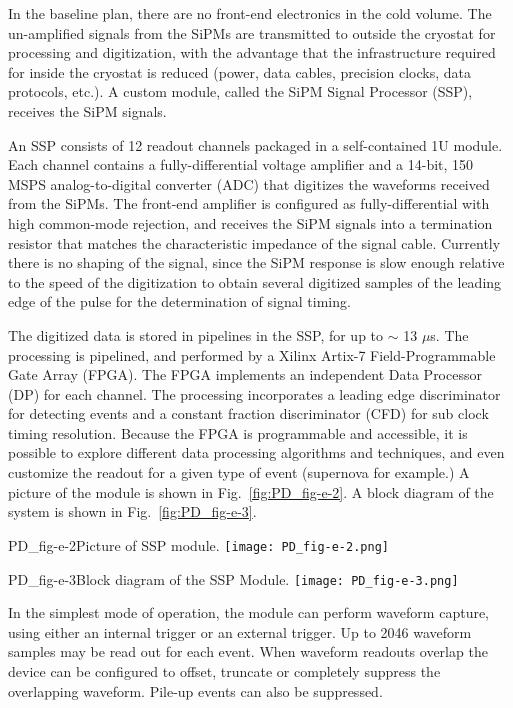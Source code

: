 In the baseline plan, there are no front-end electronics in the cold volume.  
The un-amplified signals from the SiPMs 
are transmitted to outside the cryostat %
for processing and digitization, with
the advantage that the infrastructure required for inside the cryostat is 
reduced (power, data cables, precision clocks, data protocols, etc.).  
%
A custom module, called the SiPM Signal Processor (SSP), receives the SiPM signals. %

An SSP consists of 12 readout channels packaged in a self-contained 
1U module.  
Each channel contains a fully-differential voltage amplifier and a 
14-bit, 150 MSPS analog-to-digital converter (ADC) that 
digitizes the waveforms received from the SiPMs.  
The front-end amplifier is configured as fully-differential with high common-mode 
rejection, and receives the SiPM signals into a termination resistor that 
matches the characteristic impedance of the signal cable. 
Currently there is no shaping of the signal, since the SiPM response 
is slow enough relative to the speed of the digitization to obtain 
several digitized samples of the leading edge of the pulse for the determination of signal timing.  

The digitized data is stored in pipelines in the SSP, for up to $\sim$ 13 $\mu$s.  
The processing is pipelined, and performed by a Xilinx Artix-7 
Field-Programmable Gate Array (FPGA).  
The FPGA implements an independent Data Processor (DP) for each channel.  
The processing incorporates a leading edge discriminator for detecting events
and a constant fraction discriminator (CFD) for sub 
clock timing resolution.  
Because the FPGA is programmable and accessible, it is possible to explore 
different data processing algorithms and techniques, and even customize the 
readout for a given type of event (supernova for example.)  
A picture of the module is shown in Fig.~\ref{fig:PD_fig-e-2}.  
A block diagram of the system is shown in Fig.~\ref{fig:PD_fig-e-3}.
%
\begin{cdrfigure}{PD_fig-e-2}{Picture of SSP module.}
  \texttt{[image: PD\_fig-e-2.png]}
\end{cdrfigure}

\begin{cdrfigure}{PD_fig-e-3}{Block diagram of the SSP Module.}
  \texttt{[image: PD\_fig-e-3.png]}
\end{cdrfigure}
%
In the simplest mode of operation, the module can perform waveform capture, 
using either an internal trigger or an external trigger.  
Up to 2046 waveform samples may be read out for each event.  When waveform 
readouts overlap the device can be configured to offset, 
truncate or completely suppress the overlapping waveform.  
Pile-up events can also be suppressed.  


